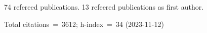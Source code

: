 74 refereed publications. 13 refeered publications as first author.

Total citations~=~3612; h-index~=~34 (2023-11-12)